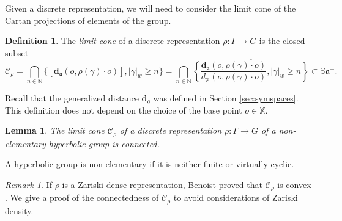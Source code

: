 \documentclass[reqno,10pt]{amsart}
\theoremstyle{plain}
\newtheorem{lem}[thm]{Lemma}
\theoremstyle{definition}
\newtheorem{defn}[thm]{Definition}
\theoremstyle{remark}
\newtheorem{rem}[thm]{Remark}
\newcommand{\Sph}{\mathbb{S}}
\newcommand{\da}{\mathbf{d}_{\mathfrak{a}}}
\newcommand{\X}{\mathbb{X}}
\begin{document}
\medskip

Given a discrete representation, we will need to consider the limit cone of the Cartan projections of elements of the group.

\begin{defn}
\label{defn:CartanCone}
The \emph{limit cone} of a discrete representation $\rho:\Gamma\to G$ is the closed subset $$\mathcal{C}_\rho=\bigcap_{n\in \mathbb{N}}\overline{\lbrace\left[\da(o,\rho(\gamma)\cdot o)\right],|\gamma|_w\geq n\rbrace}=\bigcap_{n\in \mathbb{N}}\overline{\left\lbrace\frac{\da(o,\rho(\gamma)\cdot o)}{d_\X(o,\rho(\gamma)\cdot o)},|\gamma|_w\geq n\right\rbrace} \subset \Sph\mathfrak{a}^+.$$
\end{defn}


Recall that the generalized distance $\da$ was defined in Section \ref{sec:symspaces}. This definition does not depend on the choice of the base point $o\in \X$.

\begin{lem}
\label{lem:CartanConeConnected}
The limit cone $\mathcal{C}_\rho$ of a discrete representation $\rho:\Gamma\to G$ of a  non-elementary hyperbolic group is connected.\end{lem}

A hyperbolic group is non-elementary if it is neither finite or virtually cyclic.

\begin{rem}If $\rho$ is a Zariski dense representation, Benoist proved that $\mathcal{C}_\rho$ is convex \cite{BenoistLin1}. We give a proof of the connectedness of $\mathcal{C}_\rho$ to avoid considerations of Zariski density.
\end{rem}
\end{document}
